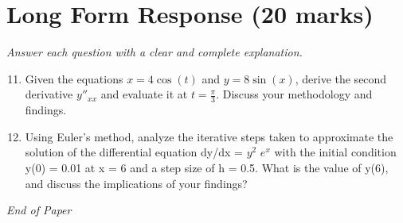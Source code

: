 \documentclass[12pt]{article}
\begin{document}
\section*{Long Form Response (20 marks)}
\textit{Answer each question with a clear and complete explanation.}
\begin{enumerate}[label=\arabic*.]
\setcounter{enumi}{10}
\item Given the equations \(x = 4 \cos(t)\) and \(y = 8 \sin(x)\), derive the second derivative \(y''_{xx}\) and evaluate it at \(t = \frac{\pi}{3}\). Discuss your methodology and findings.
\item Using Euler's method, analyze the iterative steps taken to approximate the solution of the differential equation dy/dx = $y^2$ $e^x$ with the initial condition y(0) = 0.01 at x = 6 and a step size of h = 0.5. What is the value of y(6), and discuss the implications of your findings?
\end{enumerate}

\vfill
\noindent\textit{End of Paper}
\end{document}
